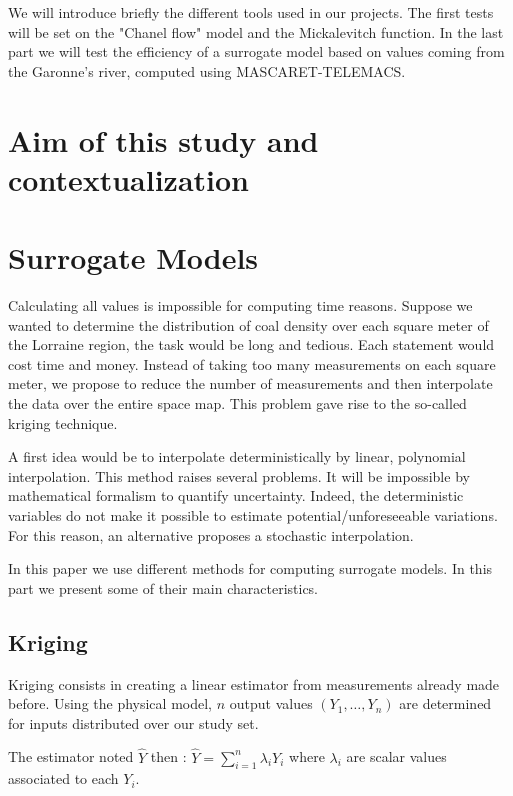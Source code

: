 \documentclass[hidelinks,12pt]{article}
\begin{document}
We will introduce briefly the different tools used in our projects. The first tests will be set on the "Chanel flow" model and the Mickalevitch function. In the last part we will test the efficiency of a surrogate model based on values coming from the Garonne's river, computed using MASCARET-TELEMACS.




\section{Aim of this study and contextualization}

\section{Surrogate Models}

Calculating all values is impossible for computing time reasons. Suppose we wanted to determine the distribution of coal density over each square meter of the Lorraine region, the task would be long and tedious. Each statement would cost time and money. Instead of taking too many measurements on each square meter, we propose to reduce the number of measurements and then interpolate the data over the entire space map. This problem gave rise to the so-called kriging technique.

A first idea would be to interpolate deterministically by linear, polynomial interpolation. This method raises several problems. It will be impossible by mathematical formalism to quantify uncertainty. Indeed, the deterministic variables do not make it possible to estimate potential/unforeseeable variations. For this reason, an alternative proposes a stochastic interpolation.

In this paper we use different methods for computing surrogate models. In this part we present some of their main characteristics.


\subsection{Kriging}

Kriging consists in creating a linear estimator from measurements already made before. Using the physical model, $n$ output values $(Y_1,\ldots,Y_n)$ are determined for inputs distributed over our study set. 

The estimator noted $\hat{Y}$ then : $\hat{Y}=\sum_{i=1}^{n}\lambda_i Y_i$ where $\lambda_i$ are scalar values associated to each $Y_i$.
\end{document}
